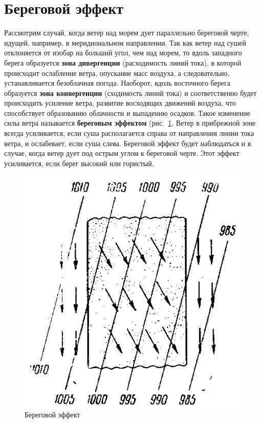 \documentclass[a4paper, 12pt, twoside, final, book, russian, fittopage, cyremdash, openright]{ncc}
\begin{document}
\section{Береговой эффект}
\label{sec:coast_effect}

Рассмотрим случай, когда ветер над морем дует параллельно береговой
черте, идущей, например, в меридиональном направлении. Так как ветер
над сушей отклоняется от изобар на больший угол, чем над морем, то
вдоль западного берега образуется \textbf{зона
  дивергенции} (расходимость линий тока), в
которой происходит ослабление ветра, опускание масс воздуха, а
следовательно, устанавливается безоблачная погода. Наоборот, вдоль
восточного берега образуется \textbf{зона
  конвергенции} (сходимость линий тока) и
соответственно будет происходить усиление ветра, развитие восходящих
движений воздуха, что способствует образованию облачности и выпадению
осадков. Такое изменение силы ветра называется \textbf{береговым
  эффектом}
(рис.~\ref{fig:02_coast_effect}. Ветер в прибрежной зоне всегда
усиливается, если суша располагается справа от направления линии тока
ветра, и ослабевает, если суша слева. Береговой эффект будет
наблюдаться и в случае, когда ветер дует под острым углом к береговой
черте. Этот эффект усиливается, если берег высокий или гористый.

\begin{figure}[htb]
   \centering
   \includegraphics[scale=0.2]{02_coast_effect.png}
   \caption{Береговой эффект}
   \label{fig:02_coast_effect}
\end{figure}
\end{document}
